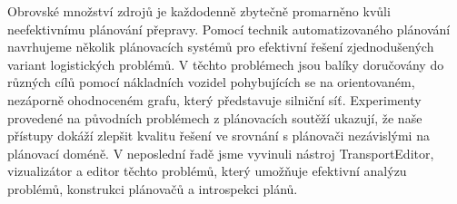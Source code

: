 \documentclass[12pt,a4paper]{article}
\begin{document}
\raggedright
\noindent Obrovské množství zdrojů je každodenně zbytečně promarněno kvůli neefektivnímu plánování přepravy.
Pomocí technik automatizovaného plánování navrhujeme několik plánovacích systémů pro efektivní řešení zjednodušených variant logistických problémů.
V těchto problémech jsou balíky doručovány do různých cílů
pomocí nákladních vozidel pohybujících se na orientovaném, nezáporně ohodnoceném grafu, který představuje silniční síť.
Experimenty provedené na původních problémech z plánovacích soutěží ukazují, že naše přístupy dokáží zlepšit kvalitu řešení ve srovnání s plánovači nezávislými na plánovací doméně.
V neposlední řadě jsme vyvinuli nástroj TransportEditor, vizualizátor a editor těchto problémů, který umožňuje efektivní analýzu problémů, konstrukci plánovačů a introspekci plánů.
\end{document}
